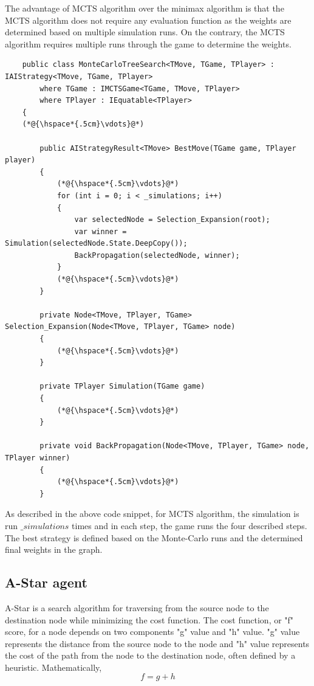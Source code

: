 The advantage of \gls{MCTS} algorithm over the minimax algorithm is that the \gls{MCTS} algorithm does not require any evaluation function as the weights are determined based on multiple simulation runs. On the contrary, the \gls{MCTS} algorithm requires multiple runs through the game to determine the weights.

\begin{lstlisting}
    public class MonteCarloTreeSearch<TMove, TGame, TPlayer> : IAIStrategy<TMove, TGame, TPlayer>
        where TGame : IMCTSGame<TGame, TMove, TPlayer>
        where TPlayer : IEquatable<TPlayer>
    {
    (*@{\hspace*{.5cm}\vdots}@*)    

        public AIStrategyResult<TMove> BestMove(TGame game, TPlayer player)
        {
            (*@{\hspace*{.5cm}\vdots}@*)
            for (int i = 0; i < _simulations; i++)
            {
                var selectedNode = Selection_Expansion(root);
                var winner = Simulation(selectedNode.State.DeepCopy());
                BackPropagation(selectedNode, winner);
            }
            (*@{\hspace*{.5cm}\vdots}@*)
        }

        private Node<TMove, TPlayer, TGame> Selection_Expansion(Node<TMove, TPlayer, TGame> node)
        {
            (*@{\hspace*{.5cm}\vdots}@*)
        }

        private TPlayer Simulation(TGame game)
        {
            (*@{\hspace*{.5cm}\vdots}@*)
        }

        private void BackPropagation(Node<TMove, TPlayer, TGame> node, TPlayer winner)
        {
            (*@{\hspace*{.5cm}\vdots}@*)        
        }
\end{lstlisting}

As described in the above code snippet, for \gls{MCTS} algorithm, the simulation is run \textit{${\_}simulations$} times and in each step, the game runs the four described steps. The best strategy is defined based on the Monte-Carlo runs and the determined final weights in the graph.

\subsection{A-Star agent}
A-Star is a search algorithm for traversing from the source node to the destination node while minimizing the cost function. The cost function, or "f" score, for a node depends on two components "g" value and "h" value. "g" value represents the distance from the source node to the node and "h" value represents the cost of the path from the node to the destination node, often defined by a heuristic. Mathematically,
\begin{equation}
    f = g + h
\end{equation}

